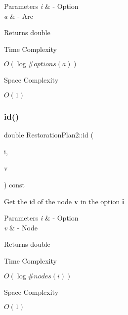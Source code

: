 \begin{DoxyParams}{Parameters}
{\em i} & -\/ Option \\
\hline
{\em a} & -\/ Arc \\
\hline
\end{DoxyParams}
\begin{DoxyReturn}{Returns}
double 
\end{DoxyReturn}
\begin{DoxyRefDesc}{Time Complexity}
\item[\hyperlink{time__time000020}{Time Complexity}]$O(\log \#options(a))$ \end{DoxyRefDesc}
\begin{DoxyRefDesc}{Space Complexity}
\item[\hyperlink{space__space000020}{Space Complexity}]$O(1)$ \end{DoxyRefDesc}
\mbox{\label{class_restoration_plan2_ab57f10bed72f50c27438e6dc06f57ca6}} 
\subsubsection{\texorpdfstring{id()}{id()}\hspace{0.1cm}{\footnotesize\ttfamily [1/2]}}
{\footnotesize\ttfamily double Restoration\+Plan2\+::id (\begin{DoxyParamCaption}\item[{\hyperlink{class_restoration_plan2_aff164a2726831342bf87af5e11df1064}{Option}}]{i,  }\item[{Graph\+\_\+t\+::\+Node}]{v }\end{DoxyParamCaption}) const\hspace{0.3cm}{\ttfamily [inline]}}



Get the id of the node {\bfseries v} in the option {\bfseries i} 


\begin{DoxyParams}{Parameters}
{\em i} & -\/ Option \\
\hline
{\em v} & -\/ Node \\
\hline
\end{DoxyParams}
\begin{DoxyReturn}{Returns}
double 
\end{DoxyReturn}
\begin{DoxyRefDesc}{Time Complexity}
\item[\hyperlink{time__time000021}{Time Complexity}]$O(\log \#nodes(i))$ \end{DoxyRefDesc}
\begin{DoxyRefDesc}{Space Complexity}
\item[\hyperlink{space__space000021}{Space Complexity}]$O(1)$ \end{DoxyRefDesc}
\mbox{\label{class_restoration_plan2_a8967a613c2f9cbabb2418217abfe8e74}} 
